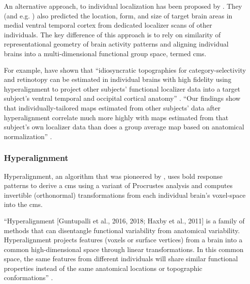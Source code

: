

An alternative approach, to individual localization has been proposed by
\citet{haxby2011common}.
%
They (and e.g. \citet{jiahui2020predicting}) also predicted the location, form,
and size of target brain areas in medial ventral temporal cortex from dedicated
localizer scans of other individuals.
%
The key difference of this approach is to rely on similarity of representational
geometry of brain activity patterns and aligning individual brains into a
multi-dimensional functional group space, termed \ac{cms}.

%
For example, \citet{haxby2011common, guntupalli2016model} have shown that
``idiosyncratic topographies for category-selectivity and retinotopy can be
estimated in individual brains with high fidelity using hyperalignment to
project other subjects' functional localizer data into a target subject's
ventral temporal and occipital cortical anatomy'' \citep{jiahui2020predicting}.
%
``Our findings show that individually-tailored maps estimated from other
subjects’ data after hyperalignment correlate much more highly with maps
estimated from that subject's own localizer data than does a group average map
based on anatomical normalization'' \citep{jiahui2020predicting}.


\subsubsection{Hyperalignment}


%
Hyperalignment, an algorithm that was pioneered by \citet{haxby2011common}, uses
\ac{bold} response patterns to derive a \ac{cms} using a variant of Procrustes
analysis and computes invertible (orthonormal) transformations from each
individual brain's voxel-space into the \ac{cms}.

%
``Hyperalignment [Guntupalli et al., 2016, 2018; Haxby et al., 2011] is a family
of methods that can disentangle functional variability from anatomical
variability. Hyperalignment projects features (voxels or surface vertices) from
a brain into a common high-dimensional space through linear transformations. In
this common space, the same features from different individuals will share
similar functional properties instead of the same anatomical locations or
topographic conformations'' \citep{feilong2018reliable}.

